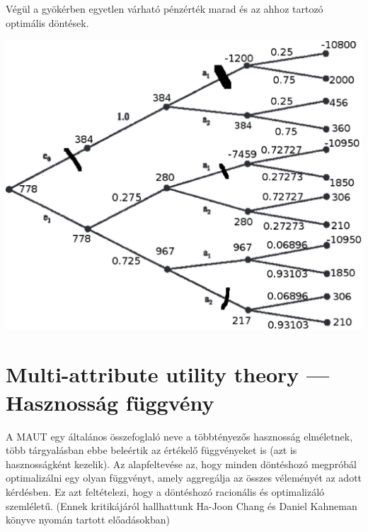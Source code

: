\documentclass[a4paper,12pt]{article}
\begin{document}
Végül a gyökérben egyetlen várható pénzérték marad és az ahhoz tartozó optimális döntések.

\begin{center}

\includegraphics[scale=0.7]{dectree02}
\\
\end{center}

\section{Multi-attribute utility theory --- Hasznosság függvény}
\label{sec:utility}

A MAUT egy általános összefoglaló neve a többtényezős hasznosság elméletnek, több tárgyalásban ebbe beleértik az értékelő függvényeket is (azt is hasznosságként kezelik). Az alapfeltevése az, hogy minden döntéshozó megpróbál optimalizálni egy olyan függvényt, amely aggregálja az összes véleményét az adott kérdésben. Ez azt feltételezi, hogy a döntéshozó racionális és optimalizáló szemléletű. (Ennek kritikájáról hallhattunk Ha-Joon Chang és Daniel Kahneman könyve nyomán tartott előadásokban)
\end{document}
